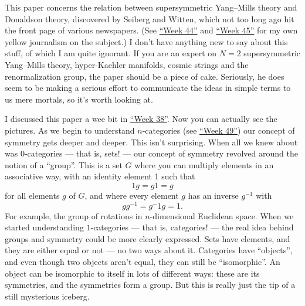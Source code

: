 \documentclass[12pt]{article}
\def\tightlist{}
\renewcommand{\texttt}[1]{%
  \begingroup
  \ttfamily
  \begingroup\lccode`~=`/\lowercase{\endgroup\def~}{/\discretionary{}{}{}}%
  \begingroup\lccode`~=`[\lowercase{\endgroup\def~}{[\discretionary{}{}{}}%
  \begingroup\lccode`~=`.\lowercase{\endgroup\def~}{.\discretionary{}{}{}}%
  \catcode`/=\active\catcode`[=\active\catcode`.=\active
  \scantokens{#1\noexpand}%
  \endgroup
}
\begin{document}

This paper concerns the relation between supersymmetric Yang--Mills
theory and Donaldson theory, discovered by Seiberg and Witten, which not
too long ago hit the front page of various newspapers. (See
\protect\hyperlink{week44}{``Week 44''} and
\protect\hyperlink{week45}{``Week 45''} for my own yellow journalism on
the subject.) I don't have anything new to say about this stuff, of
which I am quite ignorant. If you are an expert on \(N = 2\)
supersymmetric Yang--Mills theory, hyper-Kaehler manifolds, cosmic
strings and the renormalization group, the paper should be a piece of
cake. Seriously, he does seem to be making a serious effort to
communicate the ideas in simple terms to us mere mortals, so it's worth
looking at.


I discussed this paper a wee bit in \protect\hyperlink{week38}{``Week
38''}. Now you can actually see the pictures. As we begin to understand
\(n\)-categories (see \protect\hyperlink{week49}{``Week 49''}) our
concept of symmetry gets deeper and deeper. This isn't surprising. When
all we knew about was 0-categories --- that is, sets! --- our concept of
symmetry revolved around the notion of a ``group''. This is a set \(G\)
where you can multiply elements in an associative way, with an identity
element 1 such that \[1g = g1 = g\] for all elements \(g\) of \(G\), and
where every element \(g\) has an inverse \(g^{-1}\) with
\[gg^{-1} = g{^-1}g = 1.\] For example, the group of rotations in
\(n\)-dimensional Euclidean space. When we started understanding
\(1\)-categories --- that is, categories! --- the real idea behind
groups and symmetry could be more clearly expressed. Sets have elements,
and they are either equal or not --- no two ways about it. Categories
have ``objects'', and even though two objects aren't equal, they can
still be ``isomorphic''. An object can be isomorphic to itself in lots
of different ways: these are its symmetries, and the symmetries form a
group. But this is really just the tip of a still mysterious iceberg.
\end{document}
